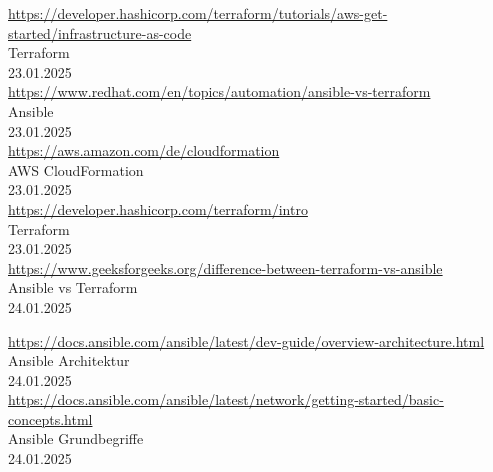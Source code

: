 \begin{thebibliography}{999}
    \href{https://developer.hashicorp.com/terraform/tutorials/aws-get-started/infrastructure-as-code}{https://developer.hashicorp.com/terraform/tutorials/aws-get-started/infrastructure-as-code} \\
    Terraform \\
    23.01.2025 \\

    \href{https://www.redhat.com/en/topics/automation/ansible-vs-terraform}{https://www.redhat.com/en/topics/automation/ansible-vs-terraform} \\
    Ansible \\
    23.01.2025 \\

    \href{https://aws.amazon.com/de/cloudformation}{https://aws.amazon.com/de/cloudformation} \\
    AWS CloudFormation \\
    23.01.2025 \\

    \href{https://developer.hashicorp.com/terraform/intro}{https://developer.hashicorp.com/terraform/intro} \\
    Terraform \\
    23.01.2025 \\

    \href{https://www.geeksforgeeks.org/difference-between-terraform-vs-ansible}{https://www.geeksforgeeks.org/difference-between-terraform-vs-ansible} \\
    Ansible vs Terraform \\
    24.01.2025 \\

    \clearpage

    \href{https://docs.ansible.com/ansible/latest/dev_guide/overview_architecture.html}{https://docs.ansible.com/ansible/latest/dev-guide/overview-architecture.html} \\
    Ansible Architektur \\
    24.01.2025 \\

     \href{https://docs.ansible.com/ansible/latest/network/getting_started/basic_concepts.html}{https://docs.ansible.com/ansible/latest/network/getting-started/basic-concepts.html} \\
     Ansible Grundbegriffe \\
     24.01.2025 \\


\end{thebibliography}

